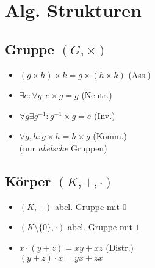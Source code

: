 \section*{Alg. Strukturen}

\subsection*{Gruppe $(G,\times)$}
\begin{itemize}
	\item $(g \times h) \times k = g \times (h \times k)$ (Ass.)
	\item $\exists e: \forall g: e \times g = g$ (Neutr.)
	\item $\forall g \exists g^{-1}: g^{-1}\times g = e$ (Inv.)
	\item $\forall g,h: g \times h = h \times g$ (Komm.)\\
		(nur \textit{abelsche} Gruppen)
\end{itemize}

\subsection*{Körper $(K, +, \cdot)$}
\begin{itemize}
	\item $(K,+)$ abel. Gruppe mit $0$
	\item $(K\setminus\{0\},\cdot)$ abel. Gruppe mit $1$
	\item $x\cdot(y+z)=xy+xz$ (Distr.) \\
		$(y+z)\cdot x=yx+zx$
\end{itemize}
